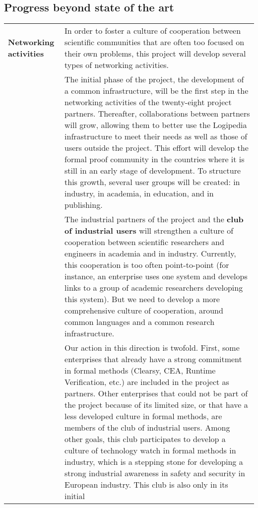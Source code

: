 \subsection*{Progress beyond state of the art}

\begin{longtable*}{|p{0.2\textwidth}|p{0.75\textwidth}|}
\hline
{\bf Networking activities}
&
In order to foster a culture of cooperation between scientific
communities that are often too focused on their own problems, this project
will develop several types of networking activities.\\
&
\hspace{0.4cm}
The initial phase of the project, the development of a common
infrastructure, will be the first step in the networking activities of
the twenty-eight project partners. Thereafter, collaborations between
partners will grow, allowing them to better use the Logipedia
infrastructure to meet their needs as well as those of users outside
the project. This effort will develop the formal proof community in
the countries where it is still in an early stage of development.  To
structure this growth, several user groups will be created: 
in industry, in academia, in education, and in publishing.\\
&
\hspace{0.4cm}
The industrial partners of the project
and the {\bf club of industrial users} 
will strengthen a culture of cooperation between scientific
researchers and engineers in academia and in industry. Currently, this
cooperation is too often point-to-point (for instance, an enterprise uses
one system and develops links to a group of academic researchers
developing this system). But we need to develop a more comprehensive
culture of cooperation, around common languages and a common research
infrastructure.\\
&
\hspace{0.4cm} Our action in this direction is twofold. First, some
enterprises that already have a strong commitment in formal methods
(Clearsy, CEA, Runtime Verification, etc.) are included in the project as
partners. Other enterprises that could not be part of the project
because of its limited size, or that have a less developed culture in
formal methods, are members of the club of industrial users. Among
other goals, this club participates to develop a culture of
technology watch in formal methods in industry, which is a stepping
stone for developing a strong industrial awareness in safety and
security in European industry. This club is also only in its initial

\end{longtable*}
